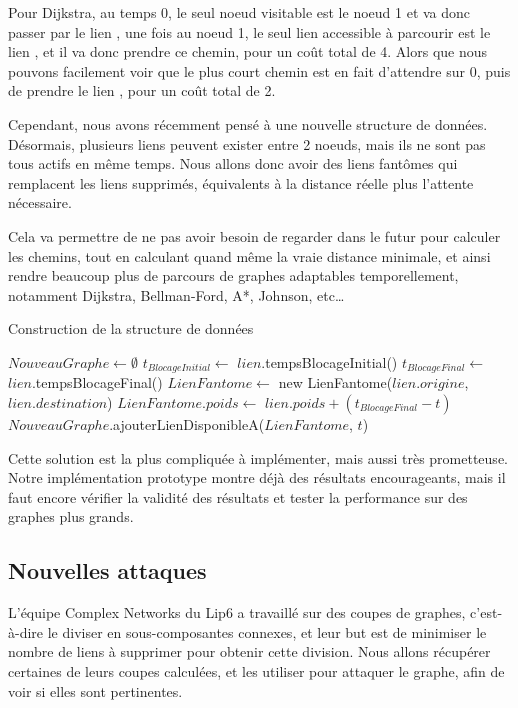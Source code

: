 Pour Dijkstra, au temps 0, le seul noeud visitable est le noeud 1 et va donc passer par le lien , une fois au noeud 1, le seul lien accessible à parcourir est le lien , et il va donc prendre ce chemin, pour un coût total de 4.
Alors que nous pouvons facilement voir que le plus court chemin est en fait d'attendre sur 0, puis de prendre le lien , pour un coût total de 2.

Cependant, nous avons récemment pensé à une nouvelle structure de données.
Désormais, plusieurs liens peuvent exister entre 2 noeuds, mais ils ne sont pas tous actifs en même temps.
Nous allons donc avoir des liens fantômes qui remplacent les liens supprimés, équivalents à la distance réelle plus l'attente nécessaire.

Cela va permettre de ne pas avoir besoin de regarder dans le futur pour calculer les chemins, tout en calculant quand même la vraie distance minimale,
et ainsi rendre beaucoup plus de parcours de graphes adaptables temporellement, notamment Dijkstra, Bellman-Ford, A*, Johnson, etc\dots

\begin{algorithm}[H]
\caption{Construction de la structure de données}
\begin{algorithmic}
\State $NouveauGraphe \gets \emptyset$
    \State $t_{BlocageInitial} \gets$ $lien$.tempsBlocageInitial()
    \State $t_{BlocageFinal} \gets$ $lien$.tempsBlocageFinal()
        \State $LienFantome \gets$ new LienFantome($lien.origine$, $lien.destination$)
        \State $LienFantome.poids \gets$ $lien.poids + (t_{BlocageFinal} - t)$
        \State $NouveauGraphe$.ajouterLienDisponibleA($LienFantome$, $t$)
    \EndFor
\EndFor
\end{algorithmic}
\end{algorithm}

Cette solution est la plus compliquée à implémenter, mais aussi très prometteuse.
Notre implémentation prototype montre déjà des résultats encourageants, mais il faut encore vérifier la validité des résultats et tester la performance sur des graphes plus grands.

\subsection{Nouvelles attaques}\label{subsec:nouvelles_attaques}
L'équipe Complex Networks du Lip6 a travaillé sur des coupes de graphes, c'est-à-dire le diviser en sous-composantes connexes, et leur but est de minimiser le nombre de liens à supprimer pour obtenir cette division.
Nous allons récupérer certaines de leurs coupes calculées, et les utiliser pour attaquer le graphe, afin de voir si elles sont pertinentes.


